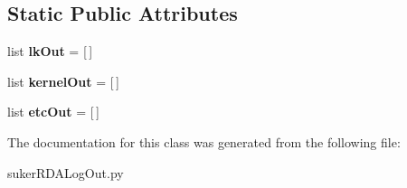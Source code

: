\subsection*{Static Public Attributes}
\begin{DoxyCompactItemize}
\item 
\hypertarget{classsuker_r_d_a_1_1rda_pkg_1_1suker_r_d_a_log_out_1_1log_outputs_a3b3a18e0090db0e77ec41ff62e137628}{list {\bfseries lk\+Out} = \mbox{[}$\,$\mbox{]}}\label{classsuker_r_d_a_1_1rda_pkg_1_1suker_r_d_a_log_out_1_1log_outputs_a3b3a18e0090db0e77ec41ff62e137628}

\item 
\hypertarget{classsuker_r_d_a_1_1rda_pkg_1_1suker_r_d_a_log_out_1_1log_outputs_a9616068e8e486c69111305b39e711b5a}{list {\bfseries kernel\+Out} = \mbox{[}$\,$\mbox{]}}\label{classsuker_r_d_a_1_1rda_pkg_1_1suker_r_d_a_log_out_1_1log_outputs_a9616068e8e486c69111305b39e711b5a}

\item 
\hypertarget{classsuker_r_d_a_1_1rda_pkg_1_1suker_r_d_a_log_out_1_1log_outputs_af3acdc343ffe0cbdd9565f60d18b1f6a}{list {\bfseries etc\+Out} = \mbox{[}$\,$\mbox{]}}\label{classsuker_r_d_a_1_1rda_pkg_1_1suker_r_d_a_log_out_1_1log_outputs_af3acdc343ffe0cbdd9565f60d18b1f6a}

\end{DoxyCompactItemize}


The documentation for this class was generated from the following file\+:\begin{DoxyCompactItemize}
\item 
suker\+R\+D\+A\+Log\+Out.\+py\end{DoxyCompactItemize}
